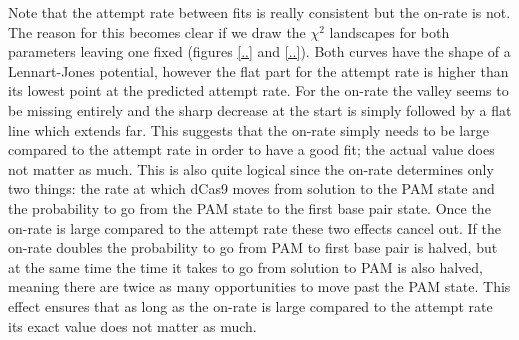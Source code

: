 Note that the attempt rate between fits is really consistent but the on-rate is not. The reason for this becomes clear if we draw the $\chi^2$ landscapes for both parameters leaving one fixed (figures \ref{..} and \ref{..}). Both curves have the shape of a Lennart-Jones potential, however the flat part for the attempt rate is higher than its lowest point at the predicted attempt rate. For the on-rate the valley seems to be missing entirely and the sharp decrease at the start is simply followed by a flat line which extends far. This suggests that the on-rate simply needs to be large compared to the attempt rate in order to have a good fit; the actual value does not matter as much. This is also quite logical since the on-rate determines only two things: the rate at which dCas9 moves from solution to the PAM state and the probability to go from the PAM state to the first base pair state. Once the on-rate is large compared to the attempt rate these two effects cancel out. If the on-rate doubles the probability to go from PAM to first base pair is halved, but at the same time the time it takes to go from solution to PAM is also halved, meaning there are twice as many opportunities to move past the PAM state. This effect ensures that as long as the on-rate is large compared to the attempt rate its exact value does not matter as much.

